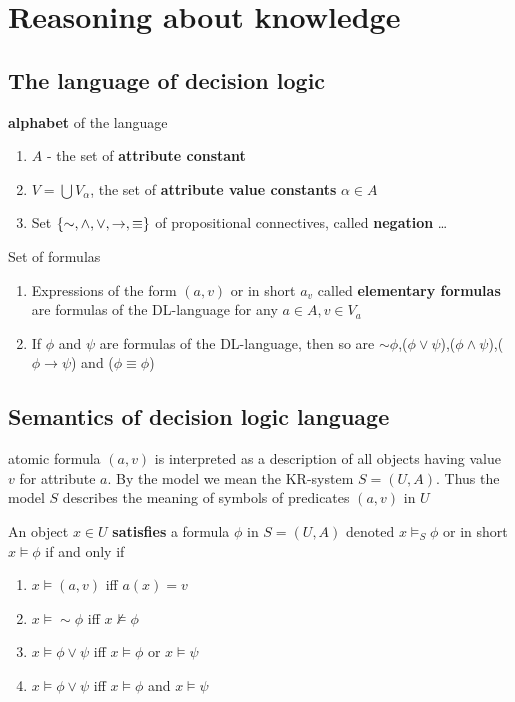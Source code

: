 \documentclass[11pt]{article}
\begin{document}
\section{Reasoning about knowledge}
\label{sec:org6339581}
\subsection{The language of decision logic}
\label{sec:org40d79a2}
\textbf{alphabet} of the language
\begin{enumerate}
\item \(A\) - the set of \textbf{attribute constant}
\item \(V=\bigcup V_\alpha\), the set of \textbf{attribute value constants} \(\alpha\in A\)
\item Set \(\left\{\sim,\wedge,\vee,\to,\equiv\right\}\) of propositional connectives, called \textbf{negation} \ldots{}
\end{enumerate}


Set of formulas
\begin{enumerate}
\item Expressions of the form \((a,v)\) or in short \(a_v\) called \textbf{elementary
formulas} are formulas of the DL-language for any \(a\in A,v\in V_a\)
\item If \(\phi\) and \(\psi\) are formulas of the DL-language, then so are
\(\sim\phi\),(\(\phi \vee \psi\)),(\(\phi \wedge \psi\)),(\(\phi \to \psi\)) and (\(\phi \equiv \phi\))
\end{enumerate}
\subsection{Semantics of decision logic language}
\label{sec:org3ad6a8e}
atomic formula \((a,v)\) is interpreted as a description of all objects having
value \(v\) for attribute \(a\). By the model we mean the KR-system \(S=(U,A)\).
Thus the model \(S\) describes the meaning of symbols of predicates \((a,v)\) in \(U\)


An object \(x\in U\) \textbf{satisfies} a formula \(\phi\) in \(S=(U,A)\) denoted \(x\models_S\phi\)
or in short \(x\models\phi\) if and only if
\begin{enumerate}
\item \(x\models(a,v)\) iff \(a(x)=v\)
\item \(x\models\sim\phi\) iff \(x\not\models\phi\)
\item \(x\models\phi\vee\psi\) iff \(x\models\phi\) or \(x\models\psi\)
\item \(x\models\phi\vee\psi\) iff \(x\models\phi\) and \(x\models\psi\)
\end{enumerate}
\end{document}
